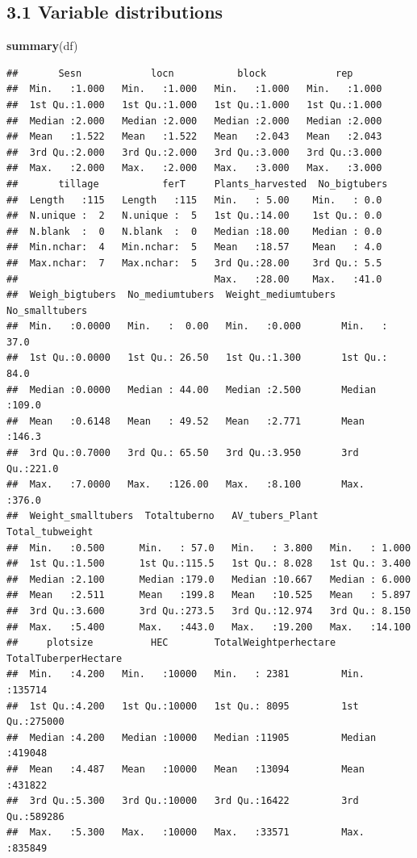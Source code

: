 \documentclass[
]{article}
\newenvironment{Shaded}{\begin{snugshade}}{\end{snugshade}}
\newcommand{\FunctionTok}[1]{\textcolor[rgb]{0.13,0.29,0.53}{\textbf{#1}}}
\newcommand{\NormalTok}[1]{#1}
\begin{document}
\subsection{3.1 Variable distributions}\label{variable-distributions}

\begin{Shaded}
\begin{Highlighting}[]
\FunctionTok{summary}\NormalTok{(df)}
\end{Highlighting}
\end{Shaded}

\begin{verbatim}
##       Sesn            locn           block            rep       
##  Min.   :1.000   Min.   :1.000   Min.   :1.000   Min.   :1.000  
##  1st Qu.:1.000   1st Qu.:1.000   1st Qu.:1.000   1st Qu.:1.000  
##  Median :2.000   Median :2.000   Median :2.000   Median :2.000  
##  Mean   :1.522   Mean   :1.522   Mean   :2.043   Mean   :2.043  
##  3rd Qu.:2.000   3rd Qu.:2.000   3rd Qu.:3.000   3rd Qu.:3.000  
##  Max.   :2.000   Max.   :2.000   Max.   :3.000   Max.   :3.000  
##       tillage           ferT     Plants_harvested  No_bigtubers 
##  Length   :115   Length   :115   Min.   : 5.00    Min.   : 0.0  
##  N.unique :  2   N.unique :  5   1st Qu.:14.00    1st Qu.: 0.0  
##  N.blank  :  0   N.blank  :  0   Median :18.00    Median : 0.0  
##  Min.nchar:  4   Min.nchar:  5   Mean   :18.57    Mean   : 4.0  
##  Max.nchar:  7   Max.nchar:  5   3rd Qu.:28.00    3rd Qu.: 5.5  
##                                  Max.   :28.00    Max.   :41.0  
##  Weigh_bigtubers  No_mediumtubers  Weight_mediumtubers No_smalltubers 
##  Min.   :0.0000   Min.   :  0.00   Min.   :0.000       Min.   : 37.0  
##  1st Qu.:0.0000   1st Qu.: 26.50   1st Qu.:1.300       1st Qu.: 84.0  
##  Median :0.0000   Median : 44.00   Median :2.500       Median :109.0  
##  Mean   :0.6148   Mean   : 49.52   Mean   :2.771       Mean   :146.3  
##  3rd Qu.:0.7000   3rd Qu.: 65.50   3rd Qu.:3.950       3rd Qu.:221.0  
##  Max.   :7.0000   Max.   :126.00   Max.   :8.100       Max.   :376.0  
##  Weight_smalltubers  Totaltuberno   AV_tubers_Plant  Total_tubweight 
##  Min.   :0.500      Min.   : 57.0   Min.   : 3.800   Min.   : 1.000  
##  1st Qu.:1.500      1st Qu.:115.5   1st Qu.: 8.028   1st Qu.: 3.400  
##  Median :2.100      Median :179.0   Median :10.667   Median : 6.000  
##  Mean   :2.511      Mean   :199.8   Mean   :10.525   Mean   : 5.897  
##  3rd Qu.:3.600      3rd Qu.:273.5   3rd Qu.:12.974   3rd Qu.: 8.150  
##  Max.   :5.400      Max.   :443.0   Max.   :19.200   Max.   :14.100  
##     plotsize          HEC        TotalWeightperhectare TotalTuberperHectare
##  Min.   :4.200   Min.   :10000   Min.   : 2381         Min.   :135714      
##  1st Qu.:4.200   1st Qu.:10000   1st Qu.: 8095         1st Qu.:275000      
##  Median :4.200   Median :10000   Median :11905         Median :419048      
##  Mean   :4.487   Mean   :10000   Mean   :13094         Mean   :431822      
##  3rd Qu.:5.300   3rd Qu.:10000   3rd Qu.:16422         3rd Qu.:589286      
##  Max.   :5.300   Max.   :10000   Max.   :33571         Max.   :835849
\end{verbatim}
\end{document}
